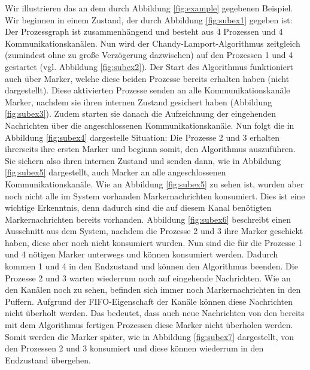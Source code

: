 \documentclass[a4paper,
12pt,
BCOR12mm,
]{scrartcl}
\begin{document}
Wir illustrieren das an dem durch Abbildung \ref{fig:example} gegebenen Beispiel. Wir
beginnen in einem Zustand, der durch Abbildung \ref{fig:subex1} gegeben ist: Der
Prozessgraph ist zusammenhängend und besteht aus 4 Prozessen und 4 Kommunikationskanälen.
Nun wird der Chandy-Lamport-Algorithmus zeitgleich (zumindest ohne zu große Verzögerung
dazwischen) auf den Prozessen 1 und 4 gestartet (vgl. Abbildung \ref{fig:subex2}). Der
Start des Algorithmus funktioniert auch über Marker, welche diese beiden Prozesse bereits
erhalten haben (nicht dargestellt). Diese aktivierten Prozesse senden an alle
Kommunikationskanäle Marker, nachdem sie ihren internen Zustand gesichert haben (Abbildung
\ref{fig:subex3}). Zudem starten sie danach die Aufzeichnung der eingehenden Nachrichten
über die angeschlossenen Kommunikationskanäle. Nun folgt die in Abbildung \ref{fig:subex4}
dargestelle Situation: Die Prozesse 2 und 3 erhalten ihrerseits ihre ersten Marker und
beginnn somit, den Algorithmus auszuführen. Sie sichern also ihren internen Zustand und
senden dann, wie in Abbildung \ref{fig:subex5} dargestellt, auch Marker an alle
angeschlossenen Kommunikationskanäle. Wie an Abbildung \ref{fig:subex5} zu sehen ist,
wurden aber noch nicht alle im System vorhanden Markernachrichten konsumiert. Dies ist
eine wichtige Erkenntnis, denn dadurch sind die auf diesem Kanal benötigten
Markernachrichten bereits vorhanden. Abbildung \ref{fig:subex6} beschreibt einen
Ausschnitt aus dem System, nachdem die Prozesse 2 und 3 ihre Marker geschickt haben, diese
aber noch nicht konsumiert wurden. Nun sind die für die Prozesse 1 und 4 nötigen Marker
unterwegs und können konsumiert werden. Dadurch kommen 1 und 4 in den Endzustand und
können den Algorithmus beenden. Die Prozesse 2 und 3 warten wiederrum noch auf eingehende
Nachrichten. Wie an den Kanälen noch zu sehen, befinden sich immer noch Markernachrichten
in den Puffern. Aufgrund der FIFO-Eigenschaft der Kanäle können diese Nachrichten nicht
überholt werden. Das bedeutet, dass auch neue Nachrichten von den bereits mit dem
Algorithmus fertigen Prozessen diese Marker nicht überholen werden. Somit werden die
Marker später, wie in Abbildung \ref{fig:subex7} dargestellt,
von den Prozessen 2 und 3 konsumiert und diese können wiederrum in den Endzustand
übergehen.
\end{document}
